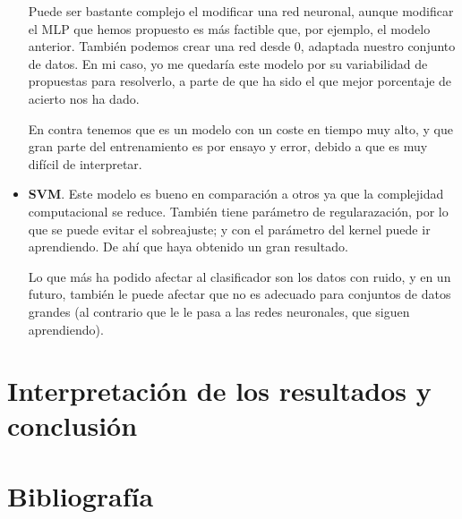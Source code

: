 \documentclass[11pt,a4paper]{article}
\begin{document}
\begin{itemize}
          Puede ser bastante complejo el modificar una red neuronal, aunque modificar el MLP que hemos propuesto es más factible
          que, por ejemplo, el modelo anterior. También podemos crear una red desde 0, adaptada nuestro conjunto de datos. En
          mi caso, yo me quedaría este modelo por su variabilidad de propuestas para resolverlo, a parte de que ha sido el que
          mejor porcentaje de acierto nos ha dado.

          En contra tenemos que es un modelo con un coste en tiempo muy alto, y que gran parte del entrenamiento es por ensayo
          y error, debido a que es muy difícil de interpretar.

    \item \textbf{SVM}. Este modelo es bueno en comparación a otros ya que la complejidad computacional se reduce. También
          tiene parámetro de regularazación, por lo que se puede evitar el sobreajuste; y con el parámetro del kernel puede
          ir aprendiendo. De ahí que haya obtenido un gran resultado.

          Lo que más ha podido afectar al clasificador son los datos con ruido, y en un futuro, también le puede afectar que
          no es adecuado para conjuntos de datos grandes (al contrario que le le pasa a las redes neuronales, que siguen
          aprendiendo).
\end{itemize}



\section{Interpretación de los resultados y conclusión}



\section{Bibliografía}
\end{document}
